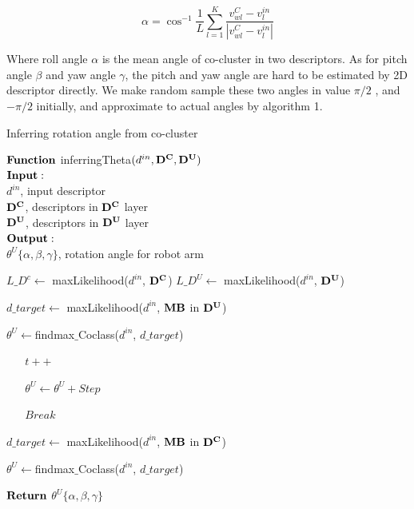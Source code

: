 \documentclass[journal]{IEEEtran}
\begin{document}
\begin{equation}
\alpha =\cos^{-1}\frac{1}{L}\sum_{l=1}^K\frac{v^C_{wl}-v^{in}_l}{|v^C_{wl}-v^{in}_l|}
\end{equation}

Where roll angle $\alpha$ is the mean angle of co-cluster in two descriptors. As for  pitch angle $\beta$ and yaw angle $\gamma$, the pitch and yaw angle are hard to be estimated by 2D descriptor directly. We make random sample these two angles in value $\pi/2$ , and $-\pi/2$ initially, and approximate to actual angles by algorithm 1.



\begin{algorithm}[!t]
  \caption{Inferring rotation angle from co-cluster}
   $\bf{Function}$ inferringTheta$(d^{in},\bf{D^C},\bf{D^U})$\\ 
  $\bf{Input:}$\\
   $d^{in}$, input descriptor\\
   $\bf{D^C}$, descriptors in $\bf{D^C}$ layer\\
   $\bf{D^U}$, descriptors in $\bf{D^U}$ layer\\
  $\bf{Output:}$\\
  $\theta^U\{\alpha,\beta,\gamma\}$, rotation angle for robot arm\\        
  \begin{algorithmic}[1]
    \State $L\_{D^c} \leftarrow$ maxLikelihood($d^{in}$, $\bf{D^C}$)
    \State $L\_{D^U} \leftarrow$ maxLikelihood($d^{in}$, $\bf{D^U}$)
    
 	$d\_target \leftarrow $ maxLikelihood($d^{in}$, $\bf{MB}$ in $\bf{D^U}$)
 		
 	$\theta^U\leftarrow$findmax$\_$Coclass($d^{in}$, $d\_target$)
 	
 		
 			
 				$\;\;\;\;\;\;t++$
 				
 				$\;\;\;\;\;\;\theta^U \leftarrow \theta^U+Step$
 				
 			\Else
 			
 				$\;\;\;\;\;\;Break$
 			\EndIf
 		
 		
 		
    	\EndWhile
    \Else
    
    	$d\_target \leftarrow $ maxLikelihood($d^{in}$, $\bf{MB}$ in $\bf{D^C}$)
    	
    	$\theta^U\leftarrow$findmax$\_$Coclass($d^{in}$, $d\_target$)
    \EndIf
    
	\State $\bf{Return}$ $\theta^U\{\alpha,\beta,\gamma\}$
    
  \end{algorithmic}
\end{algorithm}
\end{document}
